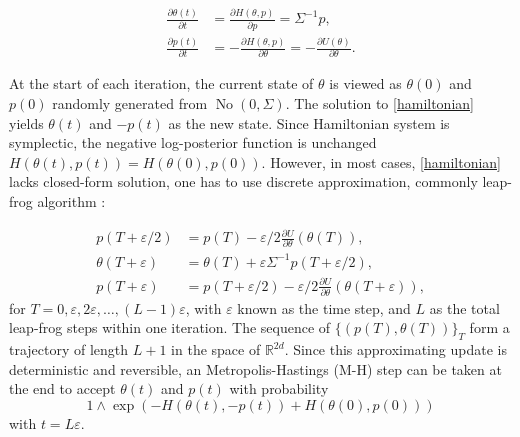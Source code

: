 \documentclass[10pt]{article}
\DeclareMathOperator{\No}{No}
\DeclareMathOperator{\1}{\mathbbm{1}}
\begin{document}
\begin{equation}
\begin{aligned}
\label{hamiltonian}
\frac{\partial \theta (t)}{\partial t} & =\frac{\partial H(\theta, p)}{\partial p} = \Sigma^{-1}p,\\
\frac{\partial p(t)}{\partial t}& =-\frac{\partial H(\theta, p)}{\partial \theta} = -\frac{\partial U(\theta)}{\partial \theta}.
\end{aligned}
\end{equation}

At the start of each iteration, the current state of $\theta$ is viewed as $\theta(0)$ and $p(0)$ randomly generated from $\No(0, \Sigma)$. The solution to \eqref{hamiltonian} yields $\theta(t)$ and $-p(t)$ as the new state. Since Hamiltonian system is symplectic, the negative log-posterior function is unchanged $H(\theta(t),p(t))=H(\theta(0),p(0))$. However, in most cases, \eqref{hamiltonian} lacks closed-form solution, one has to use discrete approximation, commonly leap-frog algorithm \citep{neal2011mcmc}:


\begin{equation}
\begin{aligned}
\label{leap-frog}
p(T+ \varepsilon/2) & = p(T) - \varepsilon/2 \frac{\partial U}{\partial  \theta } ( \theta (T)),\\
 \theta (T + \varepsilon) & =  \theta (T) + \varepsilon \Sigma^{-1}p(T+  \varepsilon/2),\\
p(T+ \varepsilon) &= p(T+ \varepsilon/2) - \varepsilon/2 \frac{\partial U}{\partial  \theta } ( \theta (T + \varepsilon)),
\end{aligned}
\end{equation}
for $T=0,\varepsilon, 2\varepsilon,\ldots, (L-1)\varepsilon$, with $\varepsilon$ known as the time step, and $L$ as the total leap-frog steps within one iteration. The sequence of $\{(p(T),\theta(T))\}_T$ form a trajectory of length $L+1$ in the space of $\mathbb R^{2d}$. Since this approximating update is deterministic and reversible, an Metropolis-Hastings (M-H) step can be taken at the end to accept $\theta(t)$ and $p(t)$ with probability 
$$1\wedge \exp  \left( - H(\theta(t),-p(t)) + H(\theta(0),p(0))\right)$$
 with $t=L\varepsilon$.
 
\end{document}
